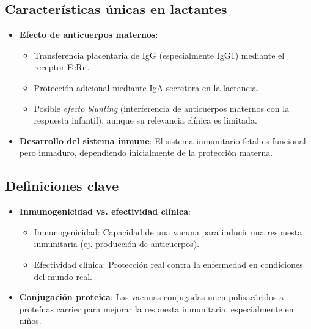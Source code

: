 \subsection{Características únicas en lactantes}
\begin{itemize}
    \item \textbf{Efecto de anticuerpos maternos}: 
    \begin{itemize}
        \item Transferencia placentaria de IgG (especialmente IgG1) mediante el receptor FcRn.
        \item Protección adicional mediante IgA secretora en la lactancia.
        \item Posible \textit{efecto blunting} (interferencia de anticuerpos maternos con la respuesta infantil), aunque su relevancia clínica es limitada.
    \end{itemize}
    
    \item \textbf{Desarrollo del sistema inmune}: 
    El sistema inmunitario fetal es funcional pero inmaduro, dependiendo inicialmente de la protección materna.
\end{itemize}

\subsection{Definiciones clave} 
\begin{itemize}
    \item \textbf{Inmunogenicidad vs. efectividad clínica}:
    \begin{itemize}
        \item Inmunogenicidad: Capacidad de una vacuna para inducir una respuesta inmunitaria (ej. producción de anticuerpos).
        \item Efectividad clínica: Protección real contra la enfermedad en condiciones del mundo real.
    \end{itemize}
    
    \item \textbf{Conjugación proteica}:
    Las vacunas conjugadas unen polisacáridos a proteínas carrier para mejorar la respuesta inmunitaria, especialmente en niños.
\end{itemize}

